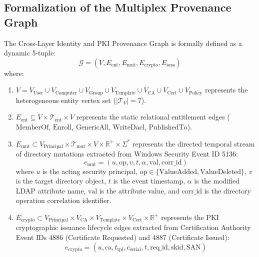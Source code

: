 \subsection{Formalization of the Multiplex Provenance Graph}
\begin{definition}
The Cross-Layer Identity and PKI Provenance Graph is formally defined as a dynamic 5-tuple:
\begin{equation}
\mathcal{G} = (V, E_{\text{ent}}, E_{\text{mut}}, E_{\text{crypto}}, E_{\text{sess}})
\end{equation}
where:
\begin{enumerate}
    \item $V = V_{\text{User}} \cup V_{\text{Computer}} \cup V_{\text{Group}} \cup V_{\text{Template}} \cup V_{\text{CA}} \cup V_{\text{Cert}} \cup V_{\text{Policy}}$ represents the heterogeneous entity vertex set ($|\mathcal{T}_V| = 7$).
    \item $E_{\text{ent}} \subseteq V \times \mathcal{T}_{\text{ent}} \times V$ represents the static relational entitlement edges ($\text{MemberOf}$, $\text{Enroll}$, $\text{GenericAll}$, $\text{WriteDacl}$, $\text{PublishedTo}$).
    \item $E_{\text{mut}} \subset V_{\text{Principal}} \times \mathcal{T}_{\text{mut}} \times V \times \mathbb{R}^+ \times \Sigma^*$ represents the directed temporal stream of directory mutations extracted from Windows Security Event ID 5136:
    \begin{equation}
    e_{\text{mut}} = (u, \text{op}, v, t, \alpha, \text{val}, \text{corr\_id})
    \end{equation}
    where $u$ is the acting security principal, $\text{op} \in \{\text{ValueAdded}, \text{ValueDeleted}\}$, $v$ is the target directory object, $t$ is the event timestamp, $\alpha$ is the modified LDAP attribute name, $\text{val}$ is the attribute value, and $\text{corr\_id}$ is the directory operation correlation identifier.
    \item $E_{\text{crypto}} \subset V_{\text{Principal}} \times V_{\text{CA}} \times V_{\text{Template}} \times V_{\text{Cert}} \times \mathbb{R}^+$ represents the PKI cryptographic issuance lifecycle edges extracted from Certification Authority Event IDs 4886 (Certificate Requested) and 4887 (Certificate Issued):
    \begin{equation}
    e_{\text{crypto}} = (u, \text{ca}, t_{\text{tpl}}, c_{\text{serial}}, t, \text{req\_id}, \text{skid}, \text{SAN})
    \end{equation}

\end{enumerate}
\end{definition}
